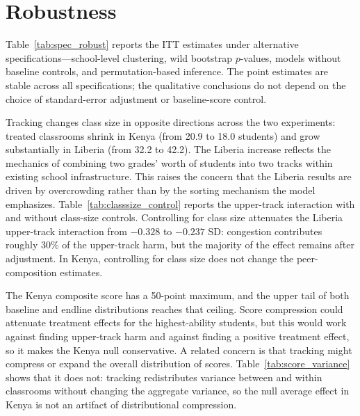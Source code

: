 \documentclass[11pt]{article}
\begin{document}
\section{Robustness}
\label{sec:robustness}

Table~\ref{tab:spec_robust} reports the ITT estimates under alternative specifications---school-level clustering, wild bootstrap $p$-values, models without baseline controls, and permutation-based inference. The point estimates are stable across all specifications; the qualitative conclusions do not depend on the choice of standard-error adjustment or baseline-score control.


Tracking changes class size in opposite directions across the two experiments: treated classrooms shrink in Kenya (from 20.9 to 18.0 students) and grow substantially in Liberia (from 32.2 to 42.2). The Liberia increase reflects the mechanics of combining two grades' worth of students into two tracks within existing school infrastructure. This raises the concern that the Liberia results are driven by overcrowding rather than by the sorting mechanism the model emphasizes. Table~\ref{tab:classsize_control} reports the upper-track interaction with and without class-size controls. Controlling for class size attenuates the Liberia upper-track interaction from $-0.328$ to $-0.237$ SD: congestion contributes roughly 30\% of the upper-track harm, but the majority of the effect remains after adjustment. In Kenya, controlling for class size does not change the peer-composition estimates.


The Kenya composite score has a 50-point maximum, and the upper tail of both baseline and endline distributions reaches that ceiling. Score compression could attenuate treatment effects for the highest-ability students, but this would work against finding upper-track harm and against finding a positive treatment effect, so it makes the Kenya null conservative. A related concern is that tracking might compress or expand the overall distribution of scores. Table~\ref{tab:score_variance} shows that it does not: tracking redistributes variance between and within classrooms without changing the aggregate variance, so the null average effect in Kenya is not an artifact of distributional compression.
\end{document}
